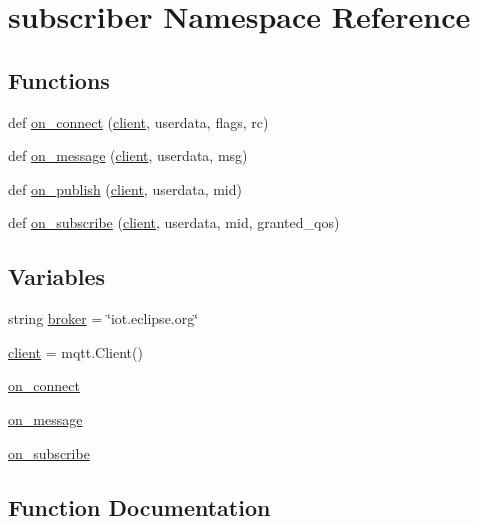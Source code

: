 \hypertarget{namespacesubscriber}{}\section{subscriber Namespace Reference}
\label{namespacesubscriber}
\subsection*{Functions}
\begin{DoxyCompactItemize}
\item 
def \hyperlink{namespacesubscriber_af5a6188d9a3af5b20d68e83535edab62}{on\+\_\+connect} (\hyperlink{namespacesubscriber_a5acfdc9abcb237779f38b5df14aeee06}{client}, userdata, flags, rc)
\item 
def \hyperlink{namespacesubscriber_affb9dd008606421298eb07cbf92cadd6}{on\+\_\+message} (\hyperlink{namespacesubscriber_a5acfdc9abcb237779f38b5df14aeee06}{client}, userdata, msg)
\item 
def \hyperlink{namespacesubscriber_a554775d1af3b9cde9dc9d53c6002455e}{on\+\_\+publish} (\hyperlink{namespacesubscriber_a5acfdc9abcb237779f38b5df14aeee06}{client}, userdata, mid)
\item 
def \hyperlink{namespacesubscriber_a9ec25dce314b3c90f0bb1ce9af05088e}{on\+\_\+subscribe} (\hyperlink{namespacesubscriber_a5acfdc9abcb237779f38b5df14aeee06}{client}, userdata, mid, granted\+\_\+qos)
\end{DoxyCompactItemize}
\subsection*{Variables}
\begin{DoxyCompactItemize}
\item 
string \hyperlink{namespacesubscriber_ac0579e6b14b607b90d4806ebb754567d}{broker} = \char`\"{}iot.\+eclipse.\+org\char`\"{}
\item 
\hyperlink{namespacesubscriber_a5acfdc9abcb237779f38b5df14aeee06}{client} = mqtt.\+Client()
\item 
\hyperlink{namespacesubscriber_a7ec53398f6d2fce6e4e491e413c0243b}{on\+\_\+connect}
\item 
\hyperlink{namespacesubscriber_ae418552672ea99e42e87f800f528c8bf}{on\+\_\+message}
\item 
\hyperlink{namespacesubscriber_a497d2d689a0a54ac21fff7a2d6cec30f}{on\+\_\+subscribe}
\end{DoxyCompactItemize}


\subsection{Function Documentation}

